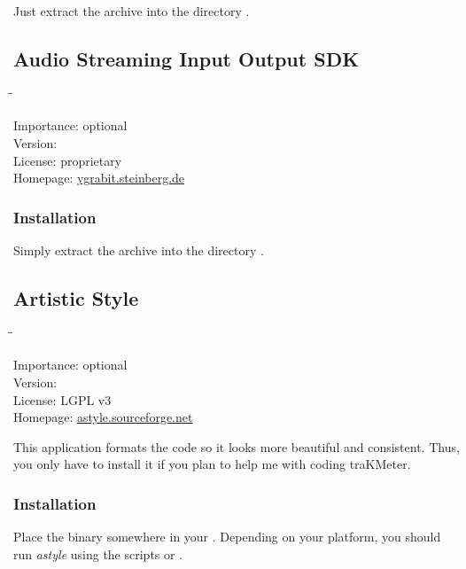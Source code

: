 Just extract the archive into the directory
.

\subsection{Audio Streaming Input Output SDK}

\begin{tabbing}
  \hspace*{6em}\=\=\kill

  Importance:  \> optional \\
  Version:      \\
  License:     \> proprietary \\
  Homepage:    \> \href{http://ygrabit.steinberg.de/}{ygrabit.steinberg.de}
\end{tabbing}

\subsubsection{Installation}

Simply extract the archive into the directory
.

\subsection{Artistic Style}

\begin{tabbing}
  \hspace*{6em}\=\=\kill

  Importance:  \> optional \\
  Version:      \\
  License:     \> LGPL v3 \\
  Homepage:    \> \href{http://astyle.sourceforge.net/}{astyle.sourceforge.net}
\end{tabbing}

This application formats the code so it looks more beautiful and
consistent.  Thus, you only have to install it if you plan to help me
with coding traKMeter.

\subsubsection{Installation}

Place the binary somewhere in your .  Depending on your
platform, you should run \emph{astyle} using the scripts
 or .

